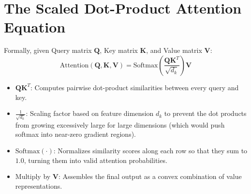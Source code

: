 \section{The Scaled Dot-Product Attention Equation}
Formally, given Query matrix $\mathbf{Q}$, Key matrix $\mathbf{K}$, and Value matrix $\mathbf{V}$:
\begin{equation}
\text{Attention}(\mathbf{Q}, \mathbf{K}, \mathbf{V}) = \text{Softmax}\left(\frac{\mathbf{Q} \mathbf{K}^T}{\sqrt{d_k}}\right) \mathbf{V}
\end{equation}
\begin{itemize}
    \item $\mathbf{Q} \mathbf{K}^T$: Computes pairwise dot-product similarities between every query and key.
    \item $\frac{1}{\sqrt{d_k}}$: Scaling factor based on feature dimension $d_k$ to prevent the dot products from growing excessively large for large dimensions (which would push softmax into near-zero gradient regions).
    \item $\text{Softmax}(\cdot)$: Normalizes similarity scores along each row so that they sum to $1.0$, turning them into valid attention probabilities.
    \item Multiply by $\mathbf{V}$: Assembles the final output as a convex combination of value representations.
\end{itemize}


